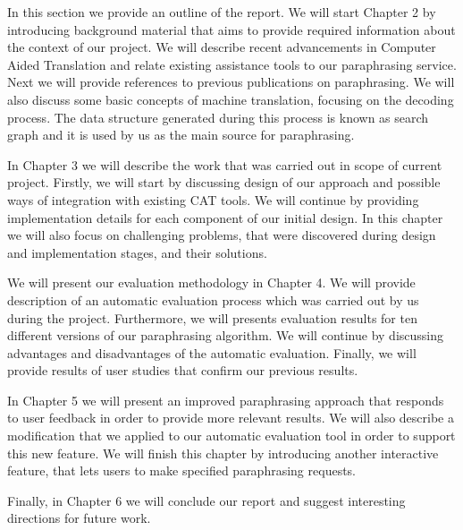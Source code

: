 In this section we provide an outline of the report. We will start Chapter 2 by introducing background material that aims to provide required information about the context of our project. We will describe recent advancements in Computer Aided Translation and relate existing assistance tools to our paraphrasing service. Next we will provide references to previous publications on paraphrasing. We will also discuss some basic concepts of machine translation, focusing on the decoding process. The data structure generated during this process is known as search graph and it is used by us as the main source for paraphrasing. 

In Chapter 3 we will describe the work that was carried out in scope of current project. Firstly, we will start by discussing design of our approach and possible ways of integration with existing CAT tools. We will continue by providing implementation details for each component of our initial design. In this chapter we will also focus on challenging problems, that were discovered during design and implementation stages, and their solutions.

We will present our evaluation methodology in Chapter 4. We will provide description of an automatic evaluation process which was carried out by us during the project. Furthermore, we will presents evaluation results for ten different versions of our paraphrasing algorithm. We will continue by discussing advantages and disadvantages of the automatic evaluation. Finally, we will provide results of user studies that confirm our previous results.

In Chapter 5 we will present an improved paraphrasing approach that responds to user feedback in order to provide more relevant results. We will also describe a modification that we applied to our automatic evaluation tool in order to support this new feature. We will finish this chapter by introducing another interactive feature, that lets users to make specified paraphrasing requests.  

Finally, in Chapter 6 we will conclude our report and suggest interesting directions for future work. 
